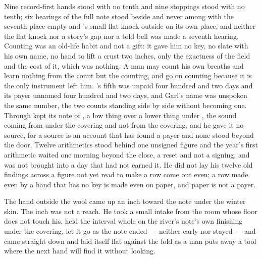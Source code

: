 Nine record-first hands stood with no tenth and nine stoppings stood with no tenth; six hearings of the full note stood beside and never among with the seventh place empty and 's small flat knock outside on its own place, and neither the flat knock nor a story's gap nor a told bell was made a seventh hearing. Counting was an old-life habit and not a gift: it gave him no key, no slate with his own name, no hand to lift a crust two inches, only the exactness of the field and the cost of it, which was nothing. A man may count his own breaths and learn nothing from the count but the counting, and go on counting because it is the only instrument left him. 's fifth was unpaid four hundred and two days and its payer unnamed four hundred and two days, and Garl's name was unspoken the same number, the two counts standing side by side without becoming one. Through   kept its note of , a low thing over a lower thing under , the sound coming from under the covering and not from the covering, and he gave it no source, for a source is an account that has found a payer and none stood beyond the door. Twelve arithmetics stood behind one unsigned figure and the year's first arithmetic waited one morning beyond the close, a reset and not a signing, and was not brought into a day that had not earned it. He did not lay his twelve old findings across a figure not yet read to make a row come out even; a row made even by a hand that has no key is made even on paper, and paper is not a payer.

The hand outside the wool came up an inch toward the note under the winter skin. The inch was not a reach. He took a small intake from the room whose floor does not touch his, held the interval whole on the river's note's own finishing under the covering, let it go as the note ended --- neither early nor stayed --- and came straight down and laid itself flat against the fold as a man puts away a tool where the next hand will find it without looking.


